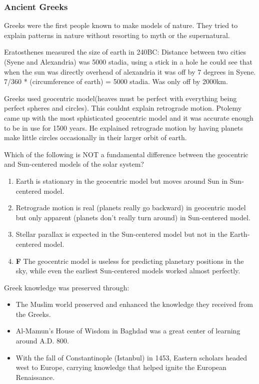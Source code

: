 \documentclass[12pt]{article}
\begin{document}
\subsubsection{Ancient Greeks}
Greeks were the first people known to make models of nature. They tried to explain patterns in nature without resorting to myth or the supernatural.

Eratosthenes measured the size of earth in 240BC: Distance between two cities (Syene and Alexandria) was 5000 stadia, using a stick in a hole he could see that when the sun was directly overhead of alexandria it was off by 7 degrees in Syene. 7/360 * (circumference of earth) = 5000 stadia. Was only off by 2000km.

Greeks used geocentric model(heaves must be perfect with everything being perfect spheres and circles). This couldnt explain retrograde motion. Ptolemy came up with the most sphisticated geocentric model and it was accurate enough to be in use for 1500 years. He explained retrograde motion by having planets make little circles occasionally in their larger orbit of earth.

Which of the following is NOT a fundamental difference between the geocentric and Sun-centered models of the  solar system?
\begin{enumerate}
    \item Earth is stationary in the geocentric model but moves around Sun in Sun-centered model.
    \item Retrograde motion is real (planets really go backward) in geocentric model but only apparent (planets don't really turn around) in Sun-centered model.
    \item Stellar parallax is expected in the Sun-centered model but not in the Earth-centered model.
    \item \textbf{F} The geocentric model is useless for predicting planetary positions in the sky, while even the earliest Sun-centered models worked almost perfectly.
\end{enumerate}

Greek knowledge was preserved through:
\begin{itemize}
    \item The Muslim world preserved and enhanced the knowledge they received from the Greeks.
    \item Al-Mamun's House of Wisdom in Baghdad was a great center of learning around A.D. 800.
    \item With the fall of Constantinople (Istanbul) in 1453, Eastern scholars headed west to Europe, carrying knowledge that helped ignite the European Renaissance.
\end{itemize}
\end{document}
